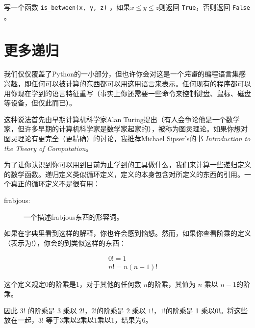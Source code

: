 \begin{ex}
写一个函数 \verb"is_between(x, y, z)" ，如果$x \le y \le z$则返回 {\tt True}，否则返回 {\tt False} 。
\end{ex}


\section{更多递归}


我们仅仅覆盖了Python的一小部分，但也许你会对这是一个{\em 完备}的编程语言集感兴趣，即任何可以被计算的东西都可以用这用语言来表示。任何现有的程序都可以用你现在学到的语言特征重写（事实上你还需要一些命令来控制键盘、鼠标、磁盘等设备，但仅此而已）。

这种说法首先由早期计算机科学家Alan Turing提出（有人会争论他是一个数学家，但许多早期的计算机科学家是数学家起家的），被称为图灵理论。如果你想对图灵理论有更完全（更精确）的讨论，我推荐Michael Sipser's的书 {\em Introduction to the Theory of Computation}。

为了让你认识到你可以用到目前为止学到的工具做什么，我们来计算一些递归定义的数学函数。递归定义类似循环定义，定义的本身包含对所定义的东西的引用。一个真正的循环定义不是很有用：

\begin{description}

\item[frabjous:] 一个描述frabjous东西的形容词。

\end{description}


如果在字典里看到这样的解释，你也许会感到恼怒。然而，如果你查看阶乘的定义（表示为$!$），你会的到类似这样的东西：

\vspace{-0.35in}
\begin{eqnarray*}
&&  0! = 1 \\
&&  n! = n (n-1)!
\end{eqnarray*}
\vspace{-0.25in}

这个定义规定0的阶乘是1，对于其他的任何数 $n$的阶乘，其值为 $n$ 乘以 $n-1$的阶乘。

因此 $3!$ 的阶乘是 3 乘以 $2!$，$2!$的阶乘是  2 乘以 $1!$，$1!$的阶乘是 1 乘以$0!$。将这些放在一起，$3!$ 等于3乘以2乘以1乘以1，结果为6。

